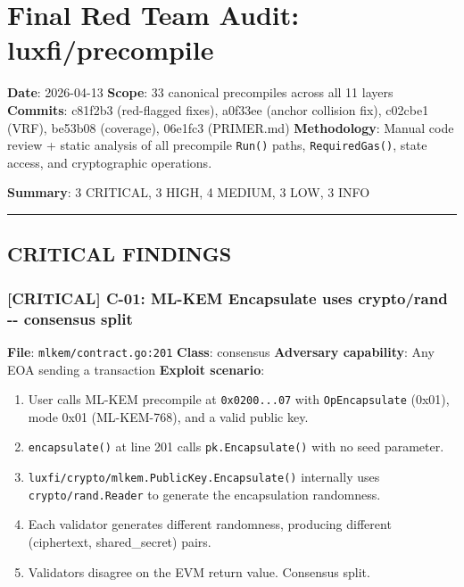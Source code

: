 \documentclass[
]{article}
\author{}
\date{}
\providecommand{\tightlist}{%
  \setlength{\itemsep}{0pt}\setlength{\parskip}{0pt}}
\begin{document}
\section{Final Red Team Audit:
luxfi/precompile}\label{final-red-team-audit-luxfiprecompile}

\textbf{Date}: 2026-04-13 \textbf{Scope}: 33 canonical precompiles
across all 11 layers \textbf{Commits}: c81f2b3 (red-flagged fixes),
a0f33ee (anchor collision fix), c02cbe1 (VRF), be53b08 (coverage),
06e1fc3 (PRIMER.md) \textbf{Methodology}: Manual code review + static
analysis of all precompile \texttt{Run()} paths, \texttt{RequiredGas()},
state access, and cryptographic operations.

\textbf{Summary}: 3 CRITICAL, 3 HIGH, 4 MEDIUM, 3 LOW, 3 INFO

\begin{center}\rule{0.5\linewidth}{0.5pt}\end{center}

\subsection{CRITICAL FINDINGS}\label{critical-findings}

\subsubsection{{[}CRITICAL{]} C-01: ML-KEM Encapsulate uses crypto/rand
-\/- consensus
split}\label{critical-c-01-ml-kem-encapsulate-uses-cryptorand----consensus-split}

\textbf{File}: \texttt{mlkem/contract.go:201} \textbf{Class}: consensus
\textbf{Adversary capability}: Any EOA sending a transaction
\textbf{Exploit scenario}:

\begin{enumerate}
\def\labelenumi{\arabic{enumi}.}
\tightlist
\item
  User calls ML-KEM precompile at \texttt{0x0200...07} with
  \texttt{OpEncapsulate} (0x01), mode 0x01 (ML-KEM-768), and a valid
  public key.
\item
  \texttt{encapsulate()} at line 201 calls \texttt{pk.Encapsulate()}
  with no seed parameter.
\item
  \texttt{luxfi/crypto/mlkem.PublicKey.Encapsulate()} internally uses
  \texttt{crypto/rand.Reader} to generate the encapsulation randomness.
\item
  Each validator generates different randomness, producing different
  (ciphertext, shared\_secret) pairs.
\item
  Validators disagree on the EVM return value. Consensus split.
\end{enumerate}
\end{document}
